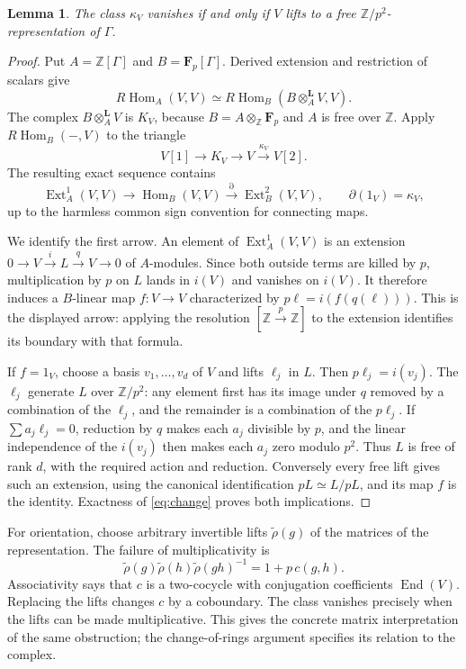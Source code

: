 \documentclass[11pt]{article}
\newcommand{\Fp}{\mathbf F_p}\newcommand{\OO}{\mathcal O}
\DeclareMathOperator{\End}{End}\DeclareMathOperator{\Hom}{Hom}
\DeclareMathOperator{\Ext}{Ext}\DeclareMathOperator{\Tor}{Tor}
\newtheorem{lemma}[theorem]{Lemma}\newtheorem{proposition}[theorem]{Proposition}
\theoremstyle{definition}\newtheorem{definition}[theorem]{Definition}
\theoremstyle{remark}\newtheorem{remark}[theorem]{Remark}
\begin{document}
\begin{lemma}\label{lem:lift}
The class $\kappa_V$ vanishes if and only if $V$ lifts to a free $\mathbb Z/p^2$-representation of $\Gamma$.
\end{lemma}
\begin{proof}
Put $A=\mathbb Z[\Gamma]$ and $B=\Fp[\Gamma]$. Derived extension and restriction of scalars give
\[
 R\Hom_A(V,V)\simeq
 R\Hom_B(B\otimes_A^{\mathbf L}V,V).
\]
The complex $B\otimes_A^{\mathbf L}V$ is $K_V$, because $B=A\otimes_{\mathbb Z}\Fp$ and $A$ is free over $\mathbb Z$. Apply $R\Hom_B(-,V)$ to the triangle
\[
 V[1]\longrightarrow K_V\longrightarrow V
          \xrightarrow{\kappa_V}V[2].
\]
The resulting exact sequence contains
\begin{equation}\label{eq:change}
 \Ext^1_A(V,V)\longrightarrow\Hom_B(V,V)
     \xrightarrow{\partial}\Ext^2_B(V,V),\qquad
 \partial(1_V)=\kappa_V,
\end{equation}
up to the harmless common sign convention for connecting maps.

We identify the first arrow. An element of $\Ext^1_A(V,V)$ is an extension
$0\to V\xrightarrow{i}L\xrightarrow{q}V\to0$ of $A$-modules. Since both outside terms are killed by $p$, multiplication by $p$ on $L$ lands in $i(V)$ and vanishes on $i(V)$. It therefore induces a $B$-linear map $f:V\to V$ characterized by $p\ell=i(f(q(\ell)))$. This is the displayed arrow: applying the resolution $[\mathbb Z\xrightarrow{p}\mathbb Z]$ to the extension identifies its boundary with that formula.

If $f=1_V$, choose a basis $v_1,\ldots,v_d$ of $V$ and lifts $\ell_j$ in $L$. Then $p\ell_j=i(v_j)$. The $\ell_j$ generate $L$ over $\mathbb Z/p^2$: any element first has its image under $q$ removed by a combination of the $\ell_j$, and the remainder is a combination of the $p\ell_j$. If $\sum a_j\ell_j=0$, reduction by $q$ makes each $a_j$ divisible by $p$, and the linear independence of the $i(v_j)$ then makes each $a_j$ zero modulo $p^2$. Thus $L$ is free of rank $d$, with the required action and reduction. Conversely every free lift gives such an extension, using the canonical identification $pL\simeq L/pL$, and its map $f$ is the identity. Exactness of \eqref{eq:change} proves both implications.
\end{proof}

For orientation, choose arbitrary invertible lifts $\widetilde\rho(g)$ of the matrices of the representation. The failure of multiplicativity is
\[
 \widetilde\rho(g)\widetilde\rho(h)
       \widetilde\rho(gh)^{-1}=1+p\,c(g,h).
\]
Associativity says that $c$ is a two-cocycle with conjugation coefficients $\End(V)$. Replacing the lifts changes $c$ by a coboundary. The class vanishes precisely when the lifts can be made multiplicative. This gives the concrete matrix interpretation of the same obstruction; the change-of-rings argument specifies its relation to the complex.
\end{document}
